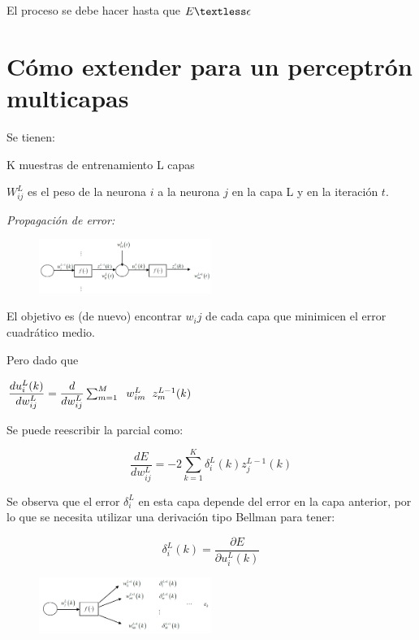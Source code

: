 El proceso se debe hacer hasta que $E\textless \epsilon$


\section{Cómo extender para un perceptrón multicapas}

Se tienen:

K muestras de entrenamiento
L capas

$W_{ij}^L$ es el peso de la neurona $i$ a la neurona $j$ en la capa L y en la iteración $t$.

\textit{Propagación de error:}

\begin{figure}[h!]
	\centering
	\includegraphics[width=0.5\textwidth]{images/img78.png}
	\label{figura78}
\end{figure}

El objetivo es (de nuevo) encontrar $w_ij$ de cada capa que minimicen el error cuadrático medio.


Pero dado que

$
\dfrac{du_i^L (k)}{dw_{ij}^L} = \dfrac{d}{dw_{ij}^L}  \sum_{m=1}^{M} \hspace{0.2cm} w_{im}^L \hspace{0.2cm} z_{m}^{L-1} (k) 
$


Se puede reescribir la parcial como:

$$\dfrac{dE}{dw_{ij}^L} = -2 \sum_{k=1}^{K}  \delta_{i}^L (k) z_{j}^{L-1}(k)$$
	
Se observa que el error $\delta_i^L$ en esta capa depende del error en la capa anterior, por lo que se necesita utilizar una derivación tipo Bellman para tener:

$$ \delta_{i}^L (k) = \dfrac{\partial E}{\partial u_{i}^L (k)} $$

\begin{figure}[h!]
	\centering
	\includegraphics[width=0.5\textwidth]{images/img79.png}
	\label{figura79}
\end{figure}

